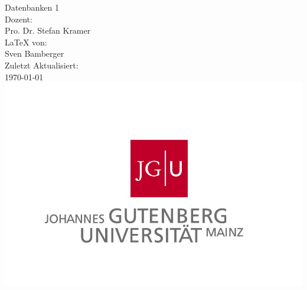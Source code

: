 \begin{titlepage}
\center
\Large Datenbanken 1 \\[2em]
Dozent:\\Pro. Dr. Stefan Kramer \\[2em]
\LaTeX{} von:\\Sven Bamberger\\[2em]
Zuletzt Aktualisiert:\\\today\\
\includegraphics[scale=.2]{front/pics/Logo.jpg}\\\quad\\
\end{titlepage}
